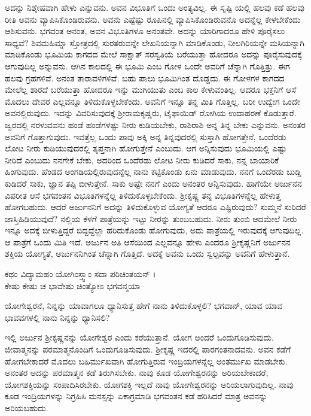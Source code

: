 ಅದನ್ನು ನಿಶ್ಶೇಷವಾಗಿ ಹೇಳು ಎನ್ನುವನು. ಅವನ ವಿಭೂತಿಗೆ ಒಂದು ಅಂತ್ಯವಿಲ್ಲ. ಈ ಸೃಷ್ಟಿ ಯಲ್ಲಿ ಹಲವು ಕಡೆ ಹಲವು ರೀತಿ ಅವನು ವ್ಯಾಪಿಸಿಕೊಂಡಿರುವನು. ಅವನು ಎಷ್ಟೆಷ್ಟು ರೂಪಿನಲ್ಲಿ ವ್ಯಾಪಿಸಿಕೊಂಡಿರುವನೊ ಅದನ್ನೆಲ್ಲ ಕೇಳಬೇಕೆಂದು ಆಶಿಸುವನು. ಭಗವಂತ ಅನಂತ, ಅವನ ವಿಭೂತಿಗಳೂ ಅನಂತವೇ. ಅದನ್ನು ಯಾರಿಗಾದರೂ ಹೇಳಿ ಪೂರೈಸಲು ಸಾಧ್ಯವೆ? ಶಿವಮಹಿಮ್ನಾ ಸ್ತೋತ್ರದಲ್ಲಿ ಸುರತರುವನ್ನೇ ಲೇಖನಿಯನ್ನಾಗಿ ಮಾಡಿಕೊಂಡು, ನೀಲಗಿರಿಯನ್ನೇ ಮಸಿಯನ್ನಾಗಿ ಮಾಡಿಕೊಂಡು ಭೂಮಿಯ ಕಾಗದದ ಮೇಲೆ ಸಾಕ್ಷಾತ್ ಸರಸ್ವತಿಯೆ ಬರೆಯುತ್ತಾ ಹೋದರೂ ಅದನ್ನು ಪೂರೈಸುವುದಕ್ಕೆ ಆಗುವುದಿಲ್ಲ ಅನ್ನುವನು. ಆಗಿನ ಕಾಲದಲ್ಲಿ ಈ ಭೂಮಿ ಎಂಬ ಗೋಳ ಒಂದೇ ಅವರಿಗೆ ಚೆನ್ನಾಗಿ ಗೊತ್ತಿತ್ತು. ಈಗ ಹಲವು ಗ್ರಹಗಳಿವೆ. ಅನಂತ ತಾರಾವಳಿಗಳಿವೆ. ಬಹು ಪಾಲು ಭೂಮಿಗಿಂತ ದೊಡ್ಡದು. ಈ ಗೋಳಗಳ ಕಾಗದದ ಮೇಲೆಲ್ಲ ಶಾರದೆ ಬರೆಯುತ್ತಾ ಹೋದರೂ ಇನ್ನು ಮುಗಿಯುತು ಎಂಬ ಕಾಲ ಕೇಳುವಂತಿಲ್ಲ. ಆದರೂ ಭಕ್ತನಿಗೆ ಆಸೆ ಮೊದಲು ದೇವರ ಎಲ್ಲವನ್ನೂ ತಿಳಿದುಕೊಳ್ಳಬೇಕೆಂದು. ಅವನಿಗೆ ಇನ್ನೂ ತನ್ನ ಮಿತಿ ಗೊತ್ತಿಲ್ಲ. ಬರೀ ಉದ್ವೇಗ ಒಂದೇ ಅವನಲ್ಲಿರುವುದು. ಇದನ್ನು ವಿವರಿಸುವುದಕ್ಕೆ ಶ್ರೀರಾಮಕೃಷ್ಣರು, ಟೈಫಾಯಿಡ್ ರೋಗಿಯ ಉದಾಹರಣೆ ಕೊಡುತ್ತಾರೆ. ಜ್ವರದಲ್ಲಿ ನರಳುವವನು ಹಂಡೆ ಹಂಡೆಗಳಷ್ಟು ನೀರು ಕುಡಿಯಬೇಕು, ರಾಶಿರಾಶಿ ಅನ್ನ ತಿನ್ನ ಬೇಕು ಎನ್ನುವನು. ಅನಂತರ ಅವನಿಗೆ ಗೊತ್ತಾಗುವುದು. ಇವತ್ತೆಲ್ಲ ಒಂದು ಪಾವು ಅಕ್ಕಿ ಅನ್ನ ತಿನ್ನವುದರಲ್ಲಿ ಸುಸ್ತಾಗಿ ಹೋಗತ್ತೇನೆ, ಒಂದೆರಡು ಲೋಟ ನೀರು ಕುಡಿಯುವುದರಲ್ಲಿ ತೃಪ್ತನಾಗಿ ಹೋಗುತ್ತೇನೆ ಎಂಬುದು. ಆಗ ಅನ್ನಿಸುವುದು ಭೂಮಿಯಲ್ಲಿ ಎಷ್ಟು ನೀರಿದೆ ಎಂಬುದು ನನಗೇಕೆ ಬೇಕು, ಅದರಿಂದ ಒಂದೆರಡು ಲೋಟ ನೀರು ಕುಡಿದರೆ ಸಾಕು, ನನ್ನ ಬಾಯಾರಿಕೆ ಹಿಂಗುವುದು. ಹೆಂಡದ ಅಂಗಡಿಯಲ್ಲಿರುವುದನ್ನೆಲ್ಲ ನಾನು ಕಟ್ಟಿಕೊಂಡು ಏನು ಮಾಡುವುದು. ನನಗೆ ಒಂದೆರಡು ಬುಡ್ಡಿ ಕುಡಿದರೆ ಸಾಕು, ಜ್ಞಾನ ತಪ್ಪಿ ಬೀಳುತ್ತೇನೆ. ಸಾಕು ಅಷ್ಟೇ ನನಗೆ ಎಂದು ಅನಂತರ ಅನ್ನಿಸುವುದು. ಹಾಗೆಯೇ ಅರ್ಜುನನ ವಿಪರೀತ ಆಸೆ ಭಗವಂತನ ವಿಭೂತಿಗಳನ್ನೆಲ್ಲ ತಿಳಿದುಕೊಳ್ಳಬೇಕೆಂದು. ಶ್ರೀಕೃಷ್ಣ ತನ್ನ ವಿಭೂತಿಗಳನ್ನೆಲ್ಲ ಹೇಳುತ್ತ ಹೋಗಬಹುದು. ಆದರೆ ಅರ್ಜುನನಿಗೆ ಅದನ್ನು ತಿಳಿದುಕೊಳ್ಳುವ ಯೋಗ್ಯತೆ ಆದರೂ ಎಷ್ಟಿರುವುದು? ಸುಮ್ಮನೆ ಸುರಿದರೆ ಜಾಸ್ತಿಹಿಡಿಯುವುದೆ? ನಲ್ಲಿಯ ಕೆಳಗೆ ಪಾತ್ರೆಯನ್ನು ಇಟ್ಟು ನೀರನ್ನು ತುಂಬಬಹುದು. ನೀರು ತುಂಬಿ ಆದಮೇಲೆ ನೀರು ಇನ್ನೂ ಅದಕ್ಕೆ ಬೀಳುತ್ತಿದ್ದರೆ ಬಿದ್ದದ್ದೆಲ್ಲಾ ಹರಿದುಕೊಂಡು ಹೋಗುವುದು, ಅದು ಪಾತ್ರೆಯಲ್ಲಿ ಇರುವುದಕ್ಕೆ ಆಗುವುದಿಲ್ಲ. ಆ ಪಾತ್ರೆಗೆ ಒಂದು ಮಿತಿ ಇದೆ. ಅರ್ಜುನ ಅತಿ ಆಸೆಯಿಂದ ಎಲ್ಲವನ್ನೂ ಹೇಳು ಎಂದರೂ ಶ್ರೀಕೃಷ್ಣನಿಗೆ ಅರ್ಜುನನ ಶಕ್ತಿಯ ಯೋಗ್ಯತೆ, ಅರ್ಜುನನಿಗಿಂತ ಚೆನ್ನಾಗಿ ಗೊತ್ತಿದೆ. ಅದಕ್ಕೆ ಅವನು ಒಂದು ಸ್ವಲ್ಪವನ್ನು ಅವನಿಗೆ ಹೇಳುತ್ತಾನೆ.

ಕಥಂ ವಿದ್ಯಾಮಹಂ ಯೋಗಿಂಸ್ತ್ವಾಂ ಸದಾ ಪರಿಚಿಂತಯನ್ ।\\ಕೇಷು ಕೇಷು ಚ ಭಾವೇಷು ಚಿಂತ್ಯೋಽ ಭಗವನ್ಮಯಾ 

{\small ಯೋಗೇಶ್ವರನೆ, ನಿನ್ನನ್ನು ಯಾವಾಗಲೂ ಧ್ಯಾನಿಸುತ್ತ ಹೇಗೆ ನಾನು ತಿಳಿದುಕೊಳ್ಳಲಿ? ಭಗವಾನ್, ಯಾವ ಯಾವ ಭಾವವಗಳಲ್ಲಿ ನಾನು ನಿನ್ನನ್ನು ಧ್ಯಾನಿಸಲಿ?}

ಇಲ್ಲಿ ಅರ್ಜುನ ಶ್ರೀಕೃಷ್ಣನನ್ನು ಯೋಗೇಶ್ವರ ಎಂದು ಕರೆಯುತ್ತಾನೆ. ಯೋಗ ಅಂದರೆ ಒಂದುಗೂಡಿಸುವುದು. ಜೀವಾತ್ಮನನ್ನು ಪರಮಾತ್ಮನೊಂದಿಗೆ ಒಂದುಗೂಡಿಸುವುದು. ಶ್ರೀಕೃಷ್ಣ ಇದರಲ್ಲಿ ಪಾರಗಂತನಾದವನು. ಅವನ ಕಡೆಗೆ ಹೋಗಬೇಕಾದರೆ ಮೊದಲು ಬಹಿರ್ಮುಖವಾಗಿ ಹೋಗುತ್ತಿರುವ ಇಂದ್ರಿಯಗಳನ್ನೆಲ್ಲ ಅಂತರ್ಮುಖ ಮಾಡಬೇಕು. ಅನಂತರ ಅದನ್ನು ಪರಮಾತ್ಮನ ಕಡೆ ತಿರುಗಿಸಬೇಕು. ನಾವು ಕೂಡ ಯೋಗೇಶ್ವರನನ್ನು ಅರಿಯಬೇಕಾದರೆ, ಯೋಗಶಕ್ತಿಯನ್ನು ಸಂಪಾದಿಸಿರಬೇಕು. ಯೋಗಶಕ್ತಿ ಇಲ್ಲದೆ ನಾವು ಯೋಗೇಶ್ವರನನ್ನು ಅರಿಯಲಾಗುವುದಿಲ್ಲ. ನಾವು ಕೂಡ ಇಂದ್ರಿಯಗಳನ್ನು ನಿಗ್ರಹಿಸಿ ಮನಸ್ಸನ್ನು ಏಕಾಗ್ರಮಾಡಿ ಭಗವಂತನ ಕಡೆ ಹರಿಸಿದರೆ ಮಾತ್ರ ಅವನನ್ನು ಅರಿಯಬಹುದು.

